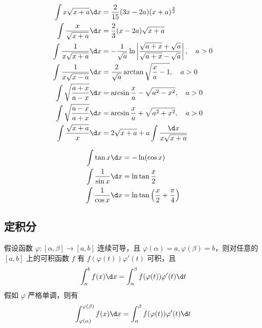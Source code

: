 \begin{example}[根式]
	\[ \begin{aligned}
			\int x \sqrt{x+a} \d x           & = \frac{2}{15} (3x - 2a) (x+a)^{\frac{3}{2}}                                                                   \\
			\int \frac{x}{\sqrt{x+a}} \d x   & = \frac{2}{3} (x - 2a) \sqrt{x+a}                                                                              \\
			\int \frac{1}{x\sqrt{x+a}} \d x  & = -\frac{1}{\sqrt{a}} \ln \left| \frac{\sqrt{a + x} + \sqrt{a}}{\sqrt{a + x} - \sqrt{a}} \right| , \quad a > 0 \\
			\int \frac{1}{x\sqrt{x-a}} \d x  & = \frac{2}{\sqrt{a}}\arctan \sqrt{\frac{x}{a}-1}, \quad a > 0                                                  \\
			\int \sqrt{\frac{a+x}{a-x}} \d x & = \arcsin \frac{x}{a} - \sqrt{a^2 - x^2}, \quad a > 0                                                          \\
			\int \sqrt{\frac{a-x}{a+x}} \d x & = \arcsin \frac{x}{a} + \sqrt{a^2 + x^2}, \quad a > 0                                                          \\
			\int \frac{\sqrt{x+a}}{x} \d x   & = 2 \sqrt{x+a} + a \int \frac{\d x}{x \sqrt{x+a}}
		\end{aligned} \]
\end{example}

\begin{example}[三角函数]
	\[ \begin{aligned}
			\int \tan x \d x           & = - \ln(\cos x)                                     \\
			\int \frac{1}{\sin x} \d x & = \ln \tan \frac{x}{2}                              \\
			\int \frac{1}{\cos x} \d x & = \ln \tan \left(\frac{x}{2} + \frac{\pi}{4}\right)
		\end{aligned} \]
\end{example}

\subsection{定积分}

\begin{theorem}
	假设函数 $\varphi : [\alpha, \beta] \to [a, b]$ 连续可导，且 $\varphi(\alpha) = a, \varphi(\beta) = b$，则对任意的 $[a, b]$ 上的可积函数 $f$ 有 $f(\varphi(t))\varphi'(t)$ 可积，且
	\[ \int_{a}^{b} f(x) \d x = \int_{\alpha}^{\beta} f(\varphi(t)) \varphi'(t) \d t \]
	假如 $\varphi$ 严格单调，则有
	\[ \int_{\varphi(\alpha)}^{\varphi(\beta)} f(x) \d x = \int_{\alpha}^{\beta} f(\varphi(t)) \varphi'(t) \d t \]

\end{theorem}

